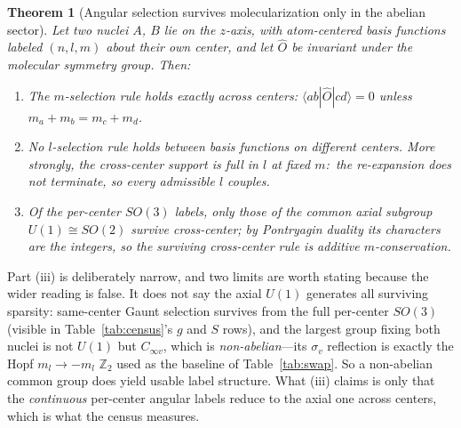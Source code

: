 \documentclass[aps,pra,twocolumn,superscriptaddress,longbibliography]{revtex4-2}
\newtheorem{theorem}{Theorem}
\begin{document}
\begin{theorem}[Angular selection survives molecularization only in the
abelian sector]
\label{thm:abelian_residue}
Let two nuclei $A$, $B$ lie on the $z$-axis, with atom-centered basis
functions labeled $(n, l, m)$ about their own center, and let
$\hat{O}$ be invariant under the molecular symmetry group.  Then:
\begin{enumerate}
\item[(i)] The $m$-selection rule holds exactly across centers:
$\langle ab | \hat{O} | cd \rangle = 0$ unless
$m_a + m_b = m_c + m_d$.
\item[(ii)] No $l$-selection rule holds between basis functions on
different centers.  More strongly, the cross-center support is \emph{full}
in $l$ at fixed $m$:\ the re-expansion does not terminate, so every
admissible $l$ couples.
\item[(iii)] Of the per-center $SO(3)$ labels, only those of the common
axial subgroup $U(1) \cong SO(2)$ survive cross-center; by Pontryagin
duality its characters are the integers, so the surviving \emph{cross-center}
rule is additive $m$-conservation.
\end{enumerate}
\end{theorem}

Part (iii) is deliberately narrow, and two limits are worth stating because
the wider reading is false.  It does not say the axial $U(1)$ generates all
surviving sparsity: same-center Gaunt selection survives from the full
per-center $SO(3)$ (visible in Table~\ref{tab:census}'s $g$ and $S$ rows),
and the largest group fixing both nuclei is not $U(1)$ but $C_{\infty v}$,
which is \emph{non-abelian}---its $\sigma_v$ reflection is exactly the
Hopf $m_l \to -m_l$ $\mathbb{Z}_2$ used as the baseline of
Table~\ref{tab:swap}.  So a non-abelian common group does yield usable
label structure.  What (iii) claims is only that the \emph{continuous}
per-center angular labels reduce to the axial one across centers, which is
what the census measures.
\end{document}
